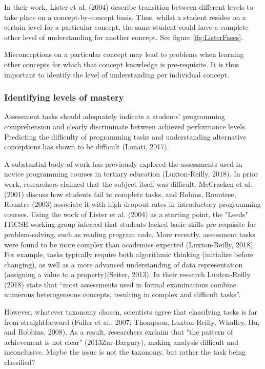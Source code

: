 In their work, Lister et al. (2004) describe transition between different levels to take place on a concept-by-concept basis. Thus, whilst a student resides on a certain level for a particular concept, the same student could have a complete other level of understanding for another concept. See figure \ref{fig:ListerFases}.





Misconceptions on a particular concept may lead to problems when learning other concepts for which that concept knowledge is pre-requisite. It is thus important to identify the level of understanding per individual concept.



\subsubsection*{Identifying levels of mastery}
Assessment tasks should adequately indicate a students’ programming comprehension and clearly discriminate between achieved performance levels. Predicting the difficulty of programming tasks and understanding alternative conceptions has shown to be difficult (Lonati, 2017).


A substantial body of work has previously explored the assessments used in novice programming courses in tertiary education (Luxton-Reilly, 2018). In prior work, researchers claimed that the subject itself was difficult. McCracken et al. (2001) discuss how students fail to complete tasks, and Robins, Rountree, Rountre (2003) associate it with high dropout rates in introductory programming courses. Using the work of Lister et al. (2004) as a starting point, the "Leeds" ITiCSE working group inferred that students lacked basic skills pre-requisite for problem-solving, such as reading program code. More recently, assessment tasks were found to be more complex than academics expected (Luxton-Reilly, 2018). For example, tasks typically require both algorithmic thinking (initialize before changing), as well as a more advanced understanding of data representation (assigning a value to a property)(Seiter, 2013). In their research Luxton-Reilly (2018) state that “most assessments used in formal examinations combine numerous heterogeneous concepts, resulting in complex and difficult tasks”.

However, whatever taxonomy chosen, scientists agree that classifying tasks is far from straightforward (Fuller et al., 2007; Thompson, Luxton-Reilly, Whalley, Hu, and Robbins, 2008). As a result, researchers exclaim that "the pattern of achievement is not clear" (2013Zur-Bargury), making analysis difficult and inconclusive. Maybe the issue is not the taxonomy, but rather the task being classified?


